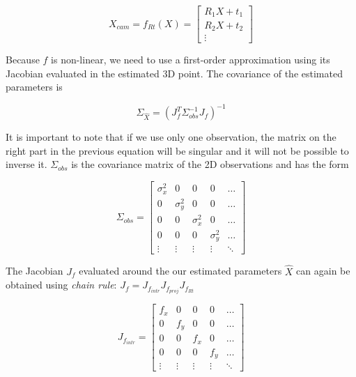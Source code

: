 \begin{equation}
    X_{cam} = f_{Rt}(X) = \left[\begin{array}{c}
        R_1 X + t_1 \\
        R_2 X + t_2 \\
        \vdots
    \end{array}\right]
\end{equation}

Because $f$ is non-linear, we need to use a first-order approximation using its Jacobian evaluated in the estimated 3D point. The covariance of the estimated parameters is

\begin{equation}
    \Sigma_{\hat{X}} = (J_f^T \Sigma_{obs}^{-1} J_f)^{-1}
\end{equation}

It is important to note that if we use only one observation, the matrix on the right part in the previous equation will be singular and it will not be possible to inverse it.
$\Sigma_{obs}$ is the covariance matrix of the 2D observations and has the form

\begin{equation}
    \Sigma_{obs} = \left[\begin{array}{ccccc}
        \sigma_x^2 & 0 & 0 & 0 & \hdots \\
        0 & \sigma_y^2 & 0 & 0 & \hdots \\
        0 & 0 & \sigma_x^2 & 0 & \hdots \\
        0 & 0 & 0 & \sigma_y^2 & \hdots \\
        \vdots & \vdots & \vdots & \vdots & \ddots 
    \end{array}\right]
\end{equation}



The Jacobian $J_f$ evaluated around the our estimated parameters $\hat{X}$ can again be obtained using \textit{chain rule}: $J_f = J_{f_{intr}} J_{f_{proj}} J_{f_{Rt}}$

\begin{equation}
   J_{f_{intr}} = \left[\begin{array}{ccccc}
       f_x & 0 & 0 & 0 & \hdots\\
        0 & f_y & 0 & 0 &\hdots \\
        0 & 0 & f_x & 0 & \hdots\\
        0 & 0 & 0 & f_y &\hdots \\
        \vdots & \vdots &  \vdots &  \vdots &  \ddots
   \end{array}\right]
\end{equation}

